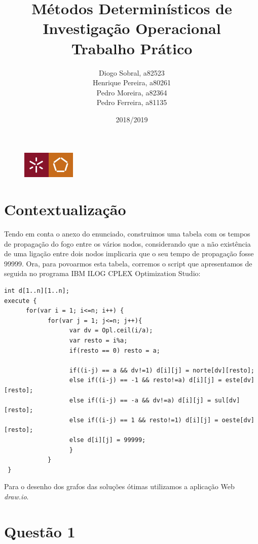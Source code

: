 \documentclass[11pt]{article} %
\title{Métodos Determinísticos de Investigação Operacional \\ \large Trabalho Prático}
\author{Diogo Sobral, a82523 \\ Henrique Pereira, a80261 \\ Pedro Moreira, a82364 \\ Pedro Ferreira, a81135}
\date{2018/2019}
\begin{document}
\maketitle

\begin{figure}[!b]
    \centering
    \includegraphics[width=1in]{um_eeng.jpg}
\end{figure}

\newpage

\section*{Contextualização}
Tendo em conta o anexo do enunciado, construimos uma tabela com os tempos de propagação do fogo entre os vários nodos, considerando que a não existência de uma ligação entre dois nodos implicaria que o seu tempo de propagação fosse 99999. Ora, para povoarmos esta tabela, corremos o script que apresentamos de seguida no programa IBM ILOG CPLEX Optimization Studio:
\begin{verbatim}
int d[1..n][1..n];
execute {
      for(var i = 1; i<=n; i++) {
            for(var j = 1; j<=n; j++){
                  var dv = Opl.ceil(i/a);
                  var resto = i%a;
                  if(resto == 0) resto = a;

                  if((i-j) == a && dv!=1) d[i][j] = norte[dv][resto];
                  else if((i-j) == -1 && resto!=a) d[i][j] = este[dv][resto];
                  else if((i-j) == -a && dv!=a) d[i][j] = sul[dv][resto];
                  else if((i-j) == 1 && resto!=1) d[i][j] = oeste[dv][resto];
                  else d[i][j] = 99999;
                  }
            }
 }
\end{verbatim}

Para o desenho dos grafos das soluções ótimas utilizamos a aplicação Web \textit{draw.io}.

\newpage

\section*{Questão 1}
\end{document}
